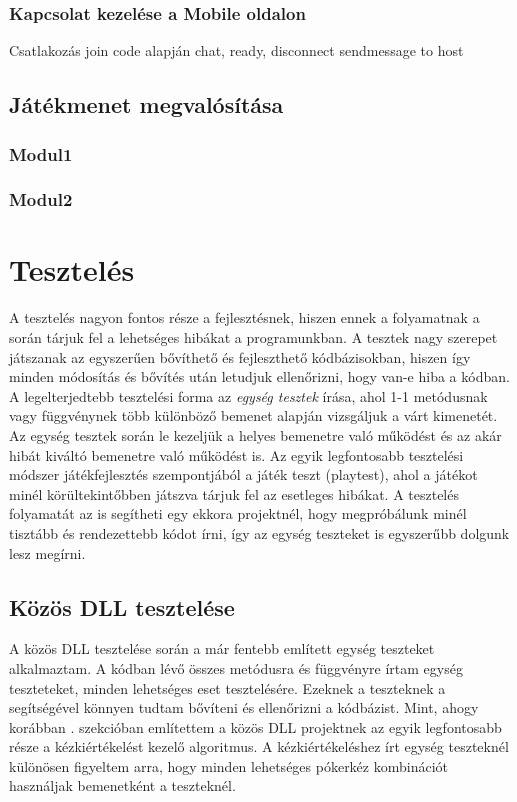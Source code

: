 \documentclass[]{thesis-ekf}
\theoremstyle{definition}
\theoremstyle{remark}
\begin{document}
\subsection{Kapcsolat kezelése a Mobile oldalon}
Csatlakozás join code alapján
chat, ready, disconnect
sendmessage to host

\section{Játékmenet megvalósítása}

\subsection{Modul1}
\subsection{Modul2}

\chapter{Tesztelés}

A tesztelés nagyon fontos része a fejlesztésnek, hiszen ennek a folyamatnak a során tárjuk fel a lehetséges hibákat a programunkban. A tesztek nagy szerepet játszanak az egyszerűen bővíthető és fejleszthető kódbázisokban, hiszen így minden módosítás és bővítés után letudjuk ellenőrizni, hogy van-e hiba a kódban. A legelterjedtebb tesztelési forma az \emph{egység tesztek} írása, ahol 1-1 metódusnak vagy függvénynek több különböző bemenet alapján vizsgáljuk a várt kimenetét. Az egység tesztek során le kezeljük a helyes bemenetre való működést és az akár hibát kiváltó bemenetre való működést is. Az egyik legfontosabb tesztelési módszer játékfejlesztés szempontjából a játék teszt (playtest), ahol a játékot minél körültekintőbben játszva tárjuk fel az esetleges hibákat. A tesztelés folyamatát az is segítheti egy ekkora projektnél, hogy megpróbálunk minél tisztább és rendezettebb kódot írni, így az egység teszteket is egyszerűbb dolgunk lesz megírni.

\section{Közös DLL tesztelése}

A közös DLL tesztelése során a már fentebb említett egység teszteket alkalmaztam. A kódban lévő összes metódusra és függvényre írtam egység teszteteket, minden lehetséges eset tesztelésére. Ezeknek a teszteknek a segítségével könnyen tudtam bővíteni és ellenőrizni a kódbázist. Mint, ahogy korábban . szekcióban említettem a közös DLL projektnek az egyik legfontosabb része a kézkiértékelést kezelő algoritmus. A kézkiértékeléshez írt egység teszteknél különösen figyeltem arra, hogy minden lehetséges pókerkéz kombinációt használjak bemenetként a teszteknél.
\end{document}

